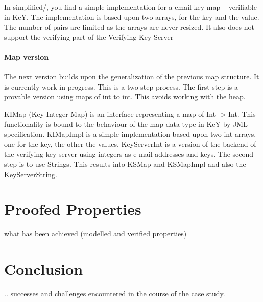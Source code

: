 \documentclass{llncs}
\begin{document}
In simplified/, you find a simple implementation for a email-key map --
verifiable in KeY. The implementation is based upon two arrays, for the key and
the value. The number of pairs are limited as the arrays are never resized. It
also does not support the verifying part of the Verifying Key Server

\paragraph{Map version}

The next version builds upon the generalization of the previous map structure.
It is currently work in progress. This is a two-step process. The first step is
a provable version using maps of int to int. This avoids working with the heap.

KIMap (Key Integer Map) is an interface representing a map of Int -> Int. This
functionality is bound to the behaviour of the map data type in KeY by JML
specification. KIMapImpl is a simple implementation based upon two int arrays,
one for the key, the other the values. KeyServerInt is a version of the backend
of the verifying key server using integers as e-mail addresses and keys. The
second step is to use Strings. This results into KSMap and KSMapImpl and also
the KeyServerString.

\section{Proofed Properties}

what has been achieved (modelled and verified properties)


\section{Conclusion }

.. successes and challenges encountered in the course of the case study.
\end{document}
